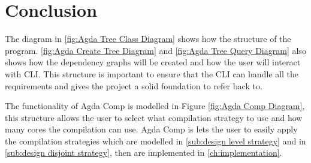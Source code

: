

\pagebreak

\section{Conclusion}

The diagram in \cref{fig:Agda Tree Class Diagram} shows how the structure of
the program. \cref{fig:Agda Create Tree Diagram} and \cref{fig:Agda Tree Query
Diagram} also shows how the dependency graphs will be created and how the user
will interact with CLI. This structure is important to ensure that the CLI can
handle all the requirements and gives the project a solid foundation to refer
back to. 

The functionality of Agda Comp is modelled in Figure \cref{fig:Agda Comp
Diagram}, this structure allows the user to select what compilation strategy to
use and how many cores the compilation can use. Agda Comp is lets the user to
easily apply the compilation strategies which are modelled in \cref{sub:design
level strategy} and in \cref{sub:design disjoint strategy}, then are
implemented in \cref{ch:implementation}.

%

